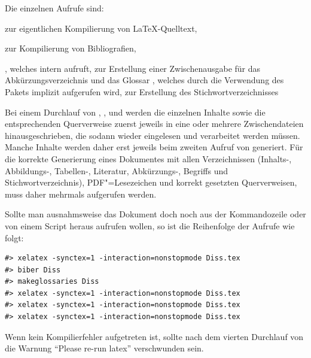 Die einzelnen Aufrufe sind:
\begin{itemize*}
\item {} zur eigentlichen Kompilierung von \LaTeX-Quelltext,
\item {} zur Kompilierung von Bibliografien,
\item {}, welches intern  aufruft,
zur Erstellung einer Zwischenausgabe für das Abkürzungsverzeichnis und das Glossar
, welches durch die Verwendung des Pakets  implizit aufgerufen wird, zur Erstellung des Stichwortverzeichnisses
\end{itemize*}
Bei einem Durchlauf von , ,  und 
werden die einzelnen Inhalte sowie die entsprechenden Querverweise
zuerst jeweils in eine oder mehrere Zwischendateien hinausgeschrieben,
die sodann wieder eingelesen und verarbeitet werden müssen.
Manche Inhalte werden daher erst jeweils beim zweiten Aufruf von  generiert.
Für die korrekte Generierung eines Dokumentes mit allen Verzeichnissen
(Inhalts-, Abbildungs-, Tabellen-, Literatur, Abkürzungs-, Begriffs und Stichwortverzeichnis),
PDF"=Lesezeichen und korrekt gesetzten Querverweisen,
muss  daher mehrmals aufgerufen werden.

Sollte man ausnahmsweise das Dokument doch noch aus der Kommandozeile oder von einem Script heraus aufrufen wollen,
so ist die Reihenfolge der Aufrufe wie folgt:
\begin{verbatim}
#> xelatex -synctex=1 -interaction=nonstopmode Diss.tex
#> biber Diss
#> makeglossaries Diss
#> xelatex -synctex=1 -interaction=nonstopmode Diss.tex
#> xelatex -synctex=1 -interaction=nonstopmode Diss.tex
#> xelatex -synctex=1 -interaction=nonstopmode Diss.tex
\end{verbatim}

Wenn kein Kompilierfehler aufgetreten ist,
sollte nach dem vierten Durchlauf von  die
Warnung \enquote{Please re-run latex}
verschwunden sein.